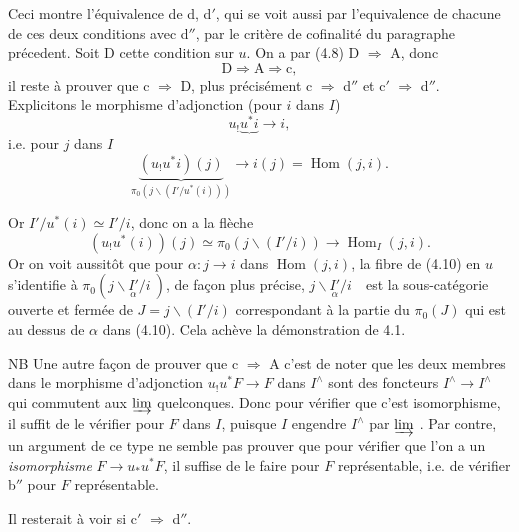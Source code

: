 \documentclass[11pt]{article}
\newcommand{\printedpage}[1]{\marginpar{\footnotesize p.~#1}}
\def\dcprintedpending{}
\newcommand{\msp}[1]{\marginpar{\footnotesize\raggedright
  \ifx\dcprintedpending\empty\else p.~\dcprintedpending\par\fi
  [#1]}\gdef\dcprintedpending{}}
\newcommand{\Hom}{\operatorname{Hom}}
\begin{document}
\printedpage{34}
Ceci montre l'équivalence de d, d$'$, qui se voit aussi par l'equivalence de chacune de ces deux conditions avec d$''$, par le critère de cofinalité du paragraphe précedent. Soit D cette condition sur $u$. On a par (4.8) D $\Longrightarrow$ A, donc %
\[
\mathrm{D} \Longrightarrow \mathrm{A} \Longrightarrow \mathrm{c},
\]
il reste à prouver que c $\Longrightarrow$ D, plus précisément c $\Longrightarrow$ d$''$ et c$'$ $\Longrightarrow$ d$''$. Explicitons le morphisme d'adjonction (pour $i$ dans $I$)
\[
u_!\underbrace{u^*i} \longrightarrow i,
\]
i.e. pour $j$ dans $I$
\[
\underbrace{(u_!u^*i)(j)}_{\pi_0(j\backslash(I'/u^*(i)))} \longrightarrow i(j) = \Hom(j,i).
\]

\msp{page 54}Or $I'/u^*(i) \simeq I'/i$, donc on a la flèche
\[
(u_!u^*(i))(j) \simeq \pi_0(j\backslash(I'/i)) \longrightarrow \Hom_I(j,i). \tag*{(4.10)}
\]
Or on voit aussitôt que pour $\alpha : j \longrightarrow i$ dans $\Hom(j,i)$, la fibre de (4.10) en $u$ s'identifie à $\pi_0(j\backslash\underset{\alpha}{I'}/i\ )$, de façon plus précise, $j\backslash\underset{\alpha}{I'}/i$\ \ est la sous-catégorie ouverte et fermée de $J = j\backslash(I'/i)$ correspondant à la partie du $\pi_0(J)$ qui est au dessus de $\alpha$ dans (4.10). Cela achève la démonstration de 4.1.

NB Une autre façon de prouver que c $\Longrightarrow$ A c'est de noter que les deux membres dans le morphisme d'adjonction $u_!u^*F \longrightarrow F$ dans $I^{\wedge}$ sont des foncteurs $I^{\wedge} \longrightarrow I^{\wedge}$ qui commutent aux $\varinjlim$ quelconques. Donc pour vérifier que c'est isomorphisme, il suffit de le vérifier pour $F$ dans $I$, puisque $I$ engendre $I^{\wedge}$ par $\varinjlim$ . Par contre, un argument de ce type ne semble pas prouver que pour vérifier que l'on a un \textit{isomorphisme} $F \longrightarrow u_*u^*F$, il suffise de le faire pour $F$ représentable, i.e. de vérifier b$''$ pour $F$ représentable.

Il resterait à voir si c$'$ $\Longrightarrow$ d$''$.
\end{document}
